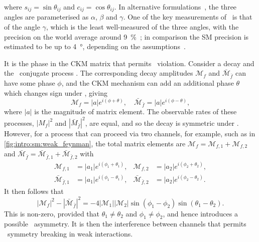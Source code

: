 where $s_{ij} = \sin{\theta_{ij}}$ and $c_{ij} = \cos{\theta_{ij}}$.
In alternative formulations~\cite{Wolfenstein:1983yz}, the three angles are 
parameterised as $\alpha$, $\beta$ and $\gamma$.
One of the key measurements of \lhcb\ is that of the angle $\gamma$, which is 
the least well-measured of the three angles, with the precision on the world 
average around \SI{9}{\percent}~\cite{LHCb-CONF-2016-001}; in comparison the 
\ac{SM} precision is estimated to be up to \SI{4}{\degree}, depending on the 
assumptions~\cite{Brod:2013sga,Brod:2014bfa}.

It is the phase in the \ac{CKM} matrix that permits \CP\ violation.
Consider a decay  and the \CP\ conjugate process
.
The corresponding decay amplitudes $\mathcal{M}_{f}$ and 
$\bar{\mathcal{M}}_{\bar{f}}$ can have some phase $\phi$, and the \ac{CKM} 
mechanism can add an additional phase $\theta$ which changes sign under \CP, 
giving
\begin{equation}
  \mathcal{M}_{f}             = |a| e^{i(\phi + \theta)}, \quad
  \bar{\mathcal{M}}_{\bar{f}} = |a| e^{i(\phi - \theta)},
  \label{eqn:intro:sm:weak:amplitudes_one}
\end{equation}
where $|a|$ is the magnitude of matrix element.
The observable rates of these processes, $|M_{f}|^{2}$ and 
$|\bar{M}_{\bar{f}}|^{2}$, are equal, and so the decay is symmetric under 
\CP\@.
However, for a process that can proceed via two channels, for example, such as 
in \cref{fig:intro:sm:weak_feynman}, the total matrix elements are 
$\mathcal{M}_{f} = \mathcal{M}_{f,1} + \mathcal{M}_{f,2}$ and 
$\bar{\mathcal{M}}_{\bar{f}} = \bar{\mathcal{M}}_{\bar{f},1} + 
\bar{\mathcal{M}}_{\bar{f},2}$ with
\begin{align*}
  \mathcal{M}_{f,1} &= |a_{1}| e^{i(\phi_{1} + \theta_{1})}, &
  \mathcal{M}_{f,2} &= |a_{2}| e^{i(\phi_{2} + \theta_{2})},\\
  \bar{\mathcal{M}}_{\bar{f},1} &= |a_{1}| e^{i(\phi_{1} - \theta_{1})}, &
  \bar{\mathcal{M}}_{\bar{f},2} &= |a_{2}| e^{i(\phi_{2} - \theta_{2})}.
\end{align*}
It then follows that
\begin{equation*}
  |\mathcal{M}_{f}|^{2} - |\bar{\mathcal{M}}_{\bar{f}}|^{2} =
  -4|\mathcal{M}_{1}||\mathcal{M}_{2}|\sin(\phi_{1} - \phi_{2})\sin(\theta_{1} 
  - \theta_{2}).
\end{equation*}
This is non-zero, provided that $\theta_{1} \neq \theta_{2}$ and $\phi_{1} \neq 
\phi_{2}$, and hence introduces a possible \CP\ asymmetry.
It is then the interference between channels that permits \CP\ symmetry 
breaking in weak interactions.

